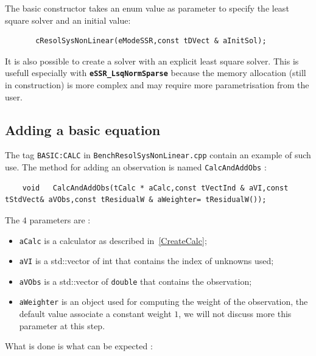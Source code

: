 The basic constructor takes an enum value as parameter to specify
the least square solver and an initial value:

\begin{lstlisting}
       cResolSysNonLinear(eModeSSR,const tDVect & aInitSol);
\end{lstlisting}


It is also possible to create a solver with an explicit least square solver.
This is usefull especially with {\bf \tt eSSR\_LsqNormSparse} because the memory
allocation (still in construction) is more complex and may require more parametrisation
from the user.  \UNCLEAR




\subsection{Adding a basic equation}

The tag  {\tt  BASIC:CALC} in {\tt BenchResolSysNonLinear.cpp} contain an example of such use.
The method for adding an observation is named {\tt CalcAndAddObs} :

\begin{lstlisting}
    void   CalcAndAddObs(tCalc * aCalc,const tVectInd & aVI,const tStdVect& aVObs,const tResidualW & aWeighter= tResidualW());
\end{lstlisting}

The $4$ parameters are :

\begin{itemize}
   \item {\tt aCalc} is a calculator as described in~\ref{CreateCalc};

   \item {\tt aVI} is a std::vector of  int that contains the index of unknowns used;

   \item {\tt aVObs} is a std::vector of  {\tt double} that contains the observation;

   \item {\tt aWeighter} is an object used for computing the weight of the observation, 
         the default value  associate a constant weight $1$, we will not discuss more 
         this parameter at this step.

\end{itemize}

What is done is what can be expected :

